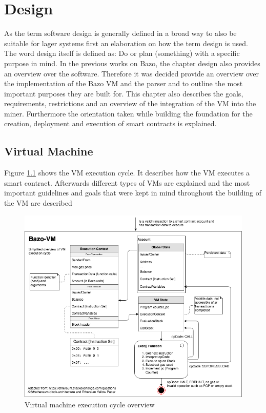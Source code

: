 \chapter{Design} \label{design_chapter}
\thispagestyle{main} %
As the term software design is generally defined in a broad way to also be suitable for lager systems first an elaboration on how the term design is used. The word design itself is defined as: Do or plan (something) with a specific purpose in mind. \cite{design_definition} 
In the previous works on Bazo, the chapter design also provides an overview over the software. Therefore it was decided provide an overview over the implementation of the  Bazo VM and the parser and to outline the most important purposes they are built for. This chapter also describes the goals, requirements, restrictions and an overview of the integration of the VM into the miner. Furthermore the orientation taken while building the foundation for the creation, deployment and execution of smart contracts is explained.

\section{Virtual Machine}
Figure \ref{vmexecutioncycle} shows the VM execution cycle. It describes how the VM executes a smart contract. Afterwards different types of VMs are explained and the most important guidelines and goals that were kept in mind throughout the building of the VM are described

\begin{figure}[H]
	\begin{center}
	\includegraphics[width=\textwidth]{./images/execution-cycle}
	\caption{Virtual machine execution cycle overview}
	\label{vmexecutioncycle}
	\end{center}
\end{figure}

